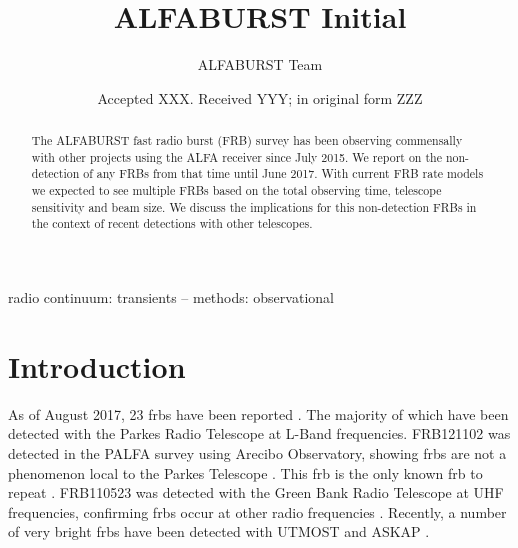 \documentclass[a4paper,fleqn,usenatbib]{mnras}
\title[ALFABURST Initial]{ALFABURST Initial}
\author[ALFABURST Team]{
ALFABURST Team
}
\date{Accepted XXX. Received YYY; in original form ZZZ}
\begin{document}
\label{firstpage}
\pagerange{\pageref{firstpage}--\pageref{lastpage}}
\maketitle

\begin{abstract}
The ALFABURST fast radio burst (FRB) survey has been observing commensally with
other projects using the ALFA receiver since July 2015. We report on the
non-detection of any FRBs from that time until June 2017. With current FRB rate
models we expected to see multiple FRBs based on the total observing time,
telescope sensitivity and beam size. We discuss the implications for this
non-detection FRBs in the context of recent detections with other telescopes.
\end{abstract}

\begin{keywords}
radio continuum: transients -- methods: observational
\end{keywords}


\section{Introduction}
\label{sec:intro}

As of August 2017, 23 \glspl{frb} have been reported
\citep{2016PASA...33...45P}. The majority of which have been detected with the
Parkes Radio Telescope at L-Band frequencies. FRB121102 was detected in the
PALFA survey using Arecibo Observatory, showing \glspl{frb} are not a phenomenon
local to the Parkes Telescope \citep{2014ApJ...790..101S}. This \gls{frb} is the
only known \gls{frb} to repeat \citep{2016ApJ...833..177S}.  FRB110523 was
detected with the Green Bank Radio Telescope at UHF frequencies, confirming
\glspl{frb} occur at other radio frequencies \citep{2015Natur.528..523M}.
Recently, a number of very bright \glspl{frb} have been detected with UTMOST
\citep{2017MNRAS.468.3746C} and ASKAP \citep{2017ApJ...841L..12B}.
\end{document}
